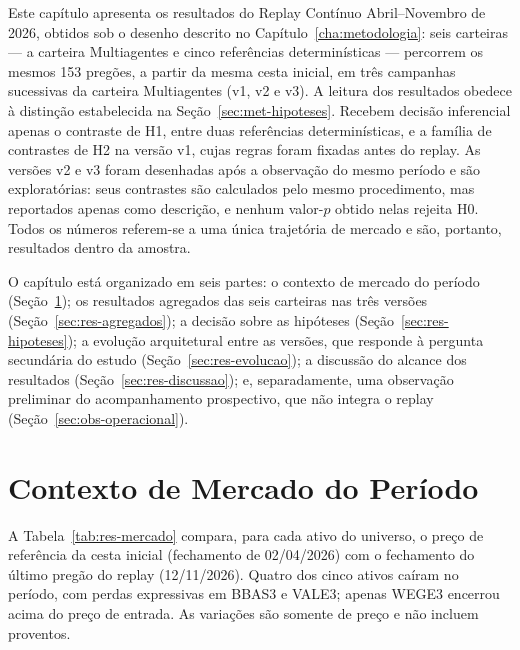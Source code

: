 \documentclass{eic-bcc-tcc}
\begin{document}
Este capítulo apresenta os resultados do Replay Contínuo Abril--Novembro de 2026, obtidos sob o desenho descrito no Capítulo~\ref{cha:metodologia}: seis carteiras --- a carteira Multiagentes e cinco referências determinísticas --- percorrem os mesmos 153 pregões, a partir da mesma cesta inicial, em três campanhas sucessivas da carteira Multiagentes (v1, v2 e v3). A leitura dos resultados obedece à distinção estabelecida na Seção~\ref{sec:met-hipoteses}. Recebem decisão inferencial apenas o contraste de H1, entre duas referências determinísticas, e a família de contrastes de H2 na versão v1, cujas regras foram fixadas antes do replay. As versões v2 e v3 foram desenhadas após a observação do mesmo período e são exploratórias: seus contrastes são calculados pelo mesmo procedimento, mas reportados apenas como descrição, e nenhum valor-$p$ obtido nelas rejeita H0. Todos os números referem-se a uma única trajetória de mercado e são, portanto, resultados dentro da amostra.

O capítulo está organizado em seis partes: o contexto de mercado do período (Seção~\ref{sec:res-mercado}); os resultados agregados das seis carteiras nas três versões (Seção~\ref{sec:res-agregados}); a decisão sobre as hipóteses (Seção~\ref{sec:res-hipoteses}); a evolução arquitetural entre as versões, que responde à pergunta secundária do estudo (Seção~\ref{sec:res-evolucao}); a discussão do alcance dos resultados (Seção~\ref{sec:res-discussao}); e, separadamente, uma observação preliminar do acompanhamento prospectivo, que não integra o replay (Seção~\ref{sec:obs-operacional}).

\section{Contexto de Mercado do Período}
\label{sec:res-mercado}

A Tabela~\ref{tab:res-mercado} compara, para cada ativo do universo, o preço de referência da cesta inicial (fechamento de 02/04/2026) com o fechamento do último pregão do replay (12/11/2026). Quatro dos cinco ativos caíram no período, com perdas expressivas em BBAS3 e VALE3; apenas WEGE3 encerrou acima do preço de entrada. As variações são somente de preço e não incluem proventos.
\end{document}
